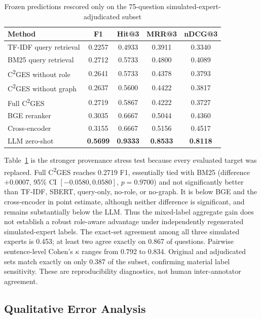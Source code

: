 \documentclass{article}
\begin{document}
\begin{table}[!ht]

\caption{Frozen predictions rescored only on the 75-question simulated-expert-adjudicated subset}
\label{tab:simexpert_subset}
\begin{tabular}{lcccc}
\toprule
\textbf{Method} & \textbf{F1} & \textbf{Hit@3} & \textbf{MRR@3} & \textbf{nDCG@3} \\
\midrule
TF-IDF query retrieval & 0.2257 & 0.4933 & 0.3911 & 0.3340 \\
BM25 query retrieval & 0.2712 & 0.5733 & 0.4800 & 0.4089 \\
C\textsuperscript{2}GES without role & 0.2641 & 0.5733 & 0.4378 & 0.3793 \\
C\textsuperscript{2}GES without graph & 0.2637 & 0.5600 & 0.4422 & 0.3817 \\
Full C\textsuperscript{2}GES & 0.2719 & 0.5867 & 0.4222 & 0.3727 \\
BGE reranker & 0.3035 & 0.6667 & 0.5044 & 0.4360 \\
Cross-encoder & 0.3155 & 0.6667 & 0.5156 & 0.4517 \\
LLM zero-shot & \textbf{0.5699} & \textbf{0.9333} & \textbf{0.8533} & \textbf{0.8118} \\
\bottomrule
\end{tabular}
\end{table}

Table~\ref{tab:simexpert_subset} is the stronger provenance stress test because every evaluated target was replaced. Full C\textsuperscript{2}GES reaches 0.2719 F1, essentially tied with BM25 (difference $+0.0007$, 95\% CI $[-0.0580,0.0580]$, $p=0.9700$) and not significantly better than TF-IDF, SBERT, query-only, no-role, or no-graph. It is below BGE and the cross-encoder in point estimate, although neither difference is significant, and remains substantially below the LLM. Thus the mixed-label aggregate gain does not establish a robust role-aware advantage under independently regenerated simulated-expert labels. The exact-set agreement among all three simulated experts is 0.453; at least two agree exactly on 0.867 of questions. Pairwise sentence-level Cohen's $\kappa$ ranges from 0.792 to 0.834. Original and adjudicated sets match exactly on only 0.387 of the subset, confirming material label sensitivity. These are reproducibility diagnostics, not human inter-annotator agreement.

\subsection{Qualitative Error Analysis}
\label{sec:error_analysis}
\end{document}

